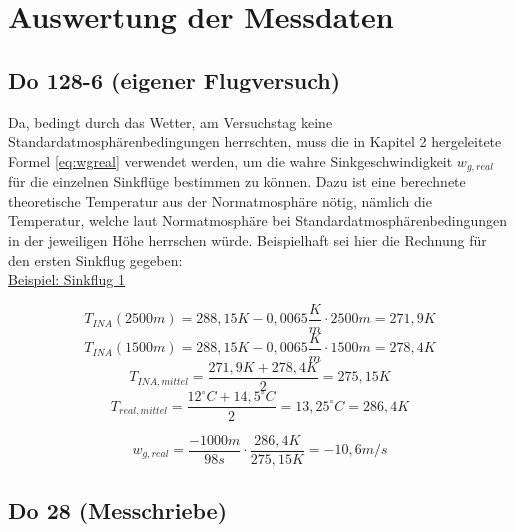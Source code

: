 \chapter{Auswertung der Messdaten}
\label{chapter:auswertung}

\section{Do 128-6 (eigener Flugversuch)}

Da, bedingt durch das Wetter, am Versuchstag keine Standardatmosphärenbedingungen herrschten, muss die in Kapitel 2 hergeleitete Formel \ref{eq:wgreal} verwendet werden, um die wahre Sinkgeschwindigkeit $w_{g,real}$ für die einzelnen Sinkflüge bestimmen zu können. Dazu ist eine berechnete theoretische Temperatur aus der Normatmosphäre nötig, nämlich die Temperatur, welche laut Normatmosphäre bei Standardatmosphärenbedingungen in der jeweiligen Höhe herrschen würde. Beispielhaft sei hier die Rechnung für den ersten Sinkflug gegeben:\\

\underline{Beispiel: Sinkflug 1}

\begin{equation}
T_{INA}(2500m) = 288,15 K - 0,0065 \frac{K}{m} \cdot 2500m = 271,9 K
\end{equation}
\begin{equation}
T_{INA}(1500m) = 288,15 K - 0,0065 \frac{K}{m} \cdot 1500m = 278,4 K
\end{equation}
\begin{equation}
T_{INA,mittel} = \frac{271,9K + 278,4K}{2} = 275,15 K
\end{equation}
\begin{equation}
T_{real,mittel} = \frac{12^\circ C + 14,5^\circ C}{2} = 13,25^\circ C =	286,4 K
\end{equation}

\begin{equation}
w_{g,real} = \frac{-1000m}{98s} \cdot \frac{286,4K}{275,15K} = - 10,6m/s
\end{equation}


\section{Do 28 (Messchriebe)}

\newpage